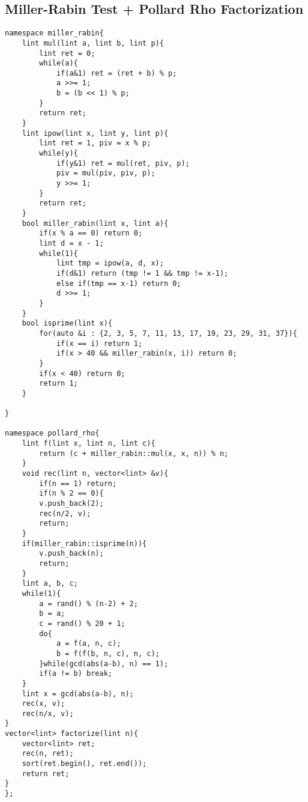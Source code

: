 \documentclass[landscape, 10pt, a4paper, oneside,  twocolumn]{article}
\begin{document}
\subsection{Miller-Rabin Test + Pollard Rho Factorization}
\begin{verbatim}
namespace miller_rabin{
	lint mul(lint a, lint b, lint p){
		lint ret = 0;
		while(a){
			if(a&1) ret = (ret + b) % p;
			a >>= 1;
			b = (b << 1) % p;
		}
		return ret;
	}
	lint ipow(lint x, lint y, lint p){
		lint ret = 1, piv = x % p;
		while(y){
			if(y&1) ret = mul(ret, piv, p);
			piv = mul(piv, piv, p);
			y >>= 1;
		}
		return ret;
	}
	bool miller_rabin(lint x, lint a){
		if(x % a == 0) return 0;
		lint d = x - 1;
		while(1){
			lint tmp = ipow(a, d, x);
			if(d&1) return (tmp != 1 && tmp != x-1);
			else if(tmp == x-1) return 0;
			d >>= 1;
		}
	}
	bool isprime(lint x){
		for(auto &i : {2, 3, 5, 7, 11, 13, 17, 19, 23, 29, 31, 37}){
			if(x == i) return 1;
			if(x > 40 && miller_rabin(x, i)) return 0;
		}
		if(x < 40) return 0;
		return 1;
	}
	
}

namespace pollard_rho{
	lint f(lint x, lint n, lint c){
		return (c + miller_rabin::mul(x, x, n)) % n;
	}
	void rec(lint n, vector<lint> &v){
		if(n == 1) return;
		if(n % 2 == 0){
		v.push_back(2);
		rec(n/2, v);
		return;
	}
	if(miller_rabin::isprime(n)){
		v.push_back(n);
		return;
	}
	lint a, b, c;
	while(1){
		a = rand() % (n-2) + 2;
		b = a;
		c = rand() % 20 + 1;
		do{
			a = f(a, n, c);
			b = f(f(b, n, c), n, c);
		}while(gcd(abs(a-b), n) == 1);
		if(a != b) break;
	}
	lint x = gcd(abs(a-b), n);
	rec(x, v);
	rec(n/x, v);
}
vector<lint> factorize(lint n){
	vector<lint> ret;
	rec(n, ret);
	sort(ret.begin(), ret.end());
	return ret;
}
};
\end{verbatim}
\end{document}
